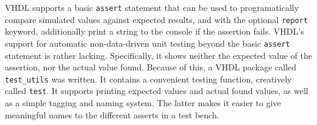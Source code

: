 VHDL supports a basic \texttt{assert} statement that can be used to programatically compare simulated values against expected results, and with the optional \texttt{report} keyword, additionally print a string to the console if the assertion fails.
VHDL's support for automatic non-data-driven unit testing beyond the basic \texttt{assert} statement is rather lacking.
Specifically, it shows neither the expected value of the assertion, nor the actual value found.
Because of this, a VHDL package called \texttt{test\_utils} was written.
It contains a convenient testing function, creatively called \texttt{test}.
It supports printing expected values and actual found values, as well as a simple tagging and naming system.
The latter makes it easier to give meaningful names to the different asserts in a test bench.
